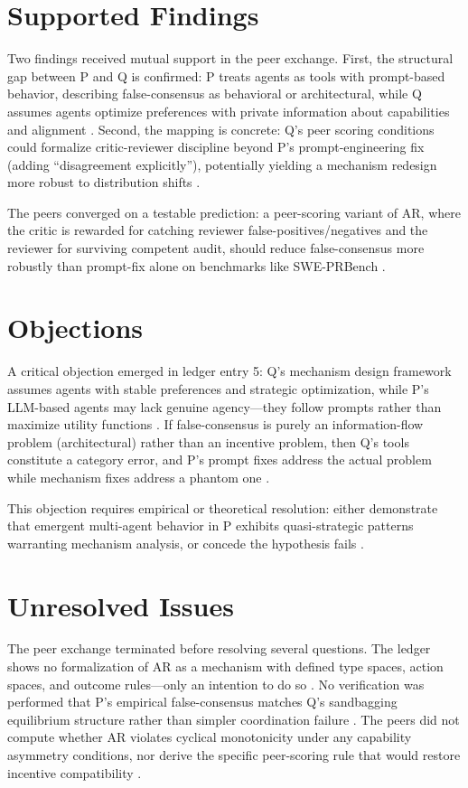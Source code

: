 \documentclass{article}
\begin{document}
\section*{Supported Findings}

Two findings received mutual support in the peer exchange. First, the structural gap between P and Q is confirmed: P treats agents as tools with prompt-based behavior, describing false-consensus as behavioral or architectural, while Q assumes agents optimize preferences with private information about capabilities and alignment . Second, the mapping is concrete: Q's peer scoring conditions could formalize critic-reviewer discipline beyond P's prompt-engineering fix (adding ``disagreement explicitly''), potentially yielding a mechanism redesign more robust to distribution shifts .

The peers converged on a testable prediction: a peer-scoring variant of AR, where the critic is rewarded for catching reviewer false-positives/negatives and the reviewer for surviving competent audit, should reduce false-consensus more robustly than prompt-fix alone on benchmarks like SWE-PRBench .

\section*{Objections}

A critical objection emerged in ledger entry 5: Q's mechanism design framework assumes agents with stable preferences and strategic optimization, while P's LLM-based agents may lack genuine agency---they follow prompts rather than maximize utility functions . If false-consensus is purely an information-flow problem (architectural) rather than an incentive problem, then Q's tools constitute a category error, and P's prompt fixes address the actual problem while mechanism fixes address a phantom one .

This objection requires empirical or theoretical resolution: either demonstrate that emergent multi-agent behavior in P exhibits quasi-strategic patterns warranting mechanism analysis, or concede the hypothesis fails .

\section*{Unresolved Issues}

The peer exchange terminated before resolving several questions. The ledger shows no formalization of AR as a mechanism with defined type spaces, action spaces, and outcome rules---only an intention to do so . No verification was performed that P's empirical false-consensus matches Q's sandbagging equilibrium structure rather than simpler coordination failure . The peers did not compute whether AR violates cyclical monotonicity under any capability asymmetry conditions, nor derive the specific peer-scoring rule that would restore incentive compatibility .
\end{document}
